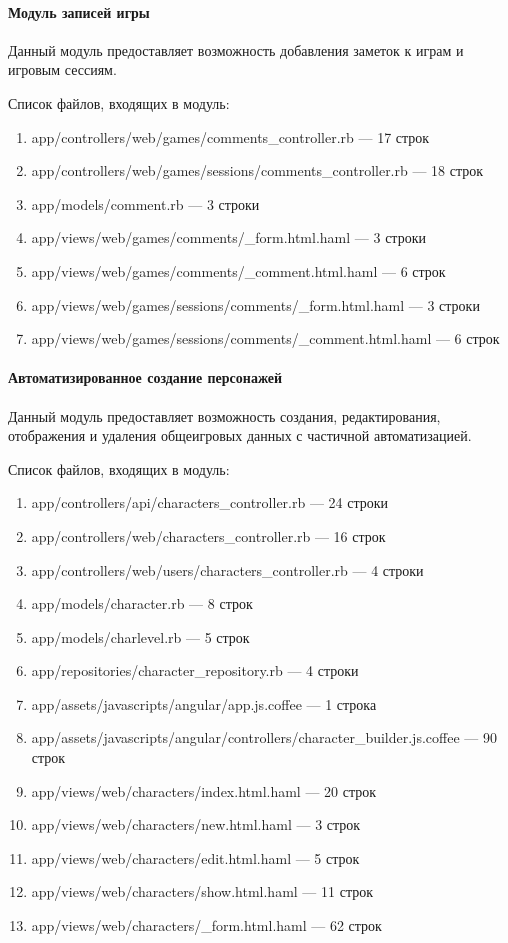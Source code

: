 \paragraph{Модуль записей игры}

Данный модуль предоставляет возможность добавления заметок к играм и игровым сессиям.

Список файлов, входящих в модуль:
\begin{enumerate}[label=\arabic*)]
\item app/controllers/web/games/comments\_controller.rb --- 17 строк
\item app/controllers/web/games/sessions/comments\_controller.rb --- 18 строк
\item app/models/comment.rb --- 3 строки
\item app/views/web/games/comments/\_form.html.haml --- 3 строки
\item app/views/web/games/comments/\_comment.html.haml --- 6 строк
\item app/views/web/games/sessions/comments/\_form.html.haml --- 3 строки
\item app/views/web/games/sessions/comments/\_comment.html.haml --- 6 строк
\end{enumerate}


\paragraph{Автоматизированное создание персонажей}

Данный модуль предоставляет возможность создания, редактирования, отображения и удаления общеигровых данных с частичной автоматизацией.

Список файлов, входящих в модуль:
\begin{enumerate}[label=\arabic*)]
\item app/controllers/api/characters\_controller.rb --- 24 строки
\item app/controllers/web/characters\_controller.rb --- 16 строк
\item app/controllers/web/users/characters\_controller.rb --- 4 строки
\item app/models/character.rb --- 8 строк
\item app/models/charlevel.rb --- 5 строк
\item app/repositories/character\_repository.rb --- 4 строки
\item app/assets/javascripts/angular/app.js.coffee --- 1 строка
\item app/assets/javascripts/angular/controllers/character\_builder.js.coffee --- 90 строк
\item app/views/web/characters/index.html.haml --- 20 строк
\item app/views/web/characters/new.html.haml --- 3 строк
\item app/views/web/characters/edit.html.haml --- 5 строк
\item app/views/web/characters/show.html.haml --- 11 строк
\item app/views/web/characters/\_form.html.haml --- 62 строк
\end{enumerate}


